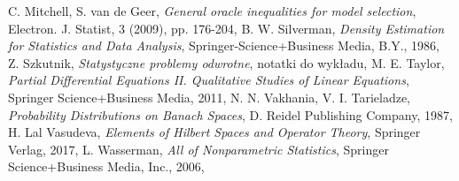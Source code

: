 \documentclass{mwart}
\begin{document}
\begin{thebibliography}{100}
 C. Mitchell, S. van de Geer, \emph{ General oracle inequalities for model selection}, Electron. J. Statist, 3 (2009), pp. 176-204,
 B. W. Silverman, \emph{Density Estimation for Statistics and Data Analysis}, Springer-Science+Business Media, B.Y., 1986,
Z. Szkutnik, \emph{Statystyczne problemy odwrotne}, notatki do wykładu,
 M. E. Taylor, \emph{Partial Differential Equations II. Qualitative Studies of Linear Equations}, Springer Science+Business Media, 2011,
 N. N. Vakhania, V. I. Tarieladze, \emph{Probability Distributions on Banach Spaces}, D. Reidel Publishing Company, 1987,
H. Lal Vasudeva, \emph{Elements of Hilbert Spaces and Operator Theory}, Springer Verlag, 2017,
L. Wasserman, \emph{All of Nonparametric Statistics},	Springer Science+Business Media, Inc.,	2006,

\end{thebibliography}
\end{document}

